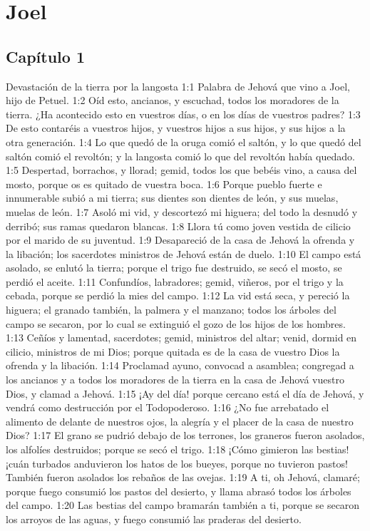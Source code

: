 \chapter{Joel}

\section*{Capítulo  1}
Devastación de la tierra por la langosta  
1:1 Palabra de Jehová que vino a Joel, hijo de Petuel.  
1:2 Oíd esto, ancianos, y escuchad, todos los moradores de la tierra. ¿Ha acontecido esto en vuestros días, o en los días de vuestros padres?  
1:3 De esto contaréis a vuestros hijos, y vuestros hijos a sus hijos, y sus hijos a la otra generación.  
1:4 Lo que quedó de la oruga comió el saltón, y lo que quedó del saltón comió el revoltón; y la langosta comió lo que del revoltón había quedado.  
1:5 Despertad, borrachos, y llorad; gemid, todos los que bebéis vino, a causa del mosto, porque os es quitado de vuestra boca.  
1:6 Porque pueblo fuerte e innumerable subió a mi tierra; sus dientes son dientes de león, y sus muelas, muelas de león.  
1:7 Asoló mi vid, y descortezó mi higuera; del todo la desnudó y derribó; sus ramas quedaron blancas.  
1:8 Llora tú como joven vestida de cilicio por el marido de su juventud.  
1:9 Desapareció de la casa de Jehová la ofrenda y la libación; los sacerdotes ministros de Jehová están de duelo.  
1:10 El campo está asolado, se enlutó la tierra; porque el trigo fue destruido, se secó el mosto, se perdió el aceite.  
1:11 Confundíos, labradores; gemid, viñeros, por el trigo y la cebada, porque se perdió la mies del campo.  
1:12 La vid está seca, y pereció la higuera; el granado también, la palmera y el manzano; todos los árboles del campo se secaron, por lo cual se extinguió el gozo de los hijos de los hombres.  
1:13 Ceñíos y lamentad, sacerdotes; gemid, ministros del altar; venid, dormid en cilicio, ministros de mi Dios; porque quitada es de la casa de vuestro Dios la ofrenda y la libación.  
1:14 Proclamad ayuno, convocad a asamblea; congregad a los ancianos y a todos los moradores de la tierra en la casa de Jehová vuestro Dios, y clamad a Jehová.  
1:15 ¡Ay del día! porque cercano está el día de Jehová, y vendrá como destrucción por el Todopoderoso. 
1:16 ¿No fue arrebatado el alimento de delante de nuestros ojos, la alegría y el placer de la casa de nuestro Dios?  
1:17 El grano se pudrió debajo de los terrones, los graneros fueron asolados, los alfolíes destruidos; porque se secó el trigo.  
1:18 ¡Cómo gimieron las bestias! ¡cuán turbados anduvieron los hatos de los bueyes, porque no tuvieron pastos! También fueron asolados los rebaños de las ovejas.  
1:19 A ti, oh Jehová, clamaré; porque fuego consumió los pastos del desierto, y llama abrasó todos los árboles del campo.  
1:20 Las bestias del campo bramarán también a ti, porque se secaron los arroyos de las aguas, y fuego consumió las praderas del desierto.  
